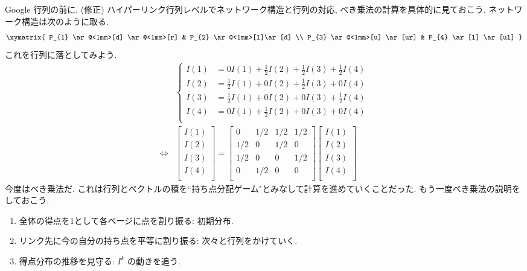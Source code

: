 \documentclass[openany, a4paper, oneside]{jsbook}
\begin{document}
Google 行列の前に, (修正) ハイパーリンク行列レベルでネットワーク構造と行列の対応,
べき乗法の計算を具体的に見ておこう.
ネットワーク構造は次のように取る.
\begin{align}
 \xymatrix{
  P_{1} \ar@<1mm>[d] \ar@<1mm>[r] & P_{2} \ar@<1mm>[l]\ar[d] \\
  P_{3} \ar@<1mm>[u] \ar[ur] & P_{4} \ar[l] \ar[ul]
 }
\end{align}
これを行列に落としてみよう.
\begin{align}
 &\begin{cases}
  I(1)
  &=
  0I(1)    +    \frac{1}{2} I(2)    +    \frac{1}{2}I(3)    +    \frac{1}{2}I(4)\\
  I(2)
  &=
  \frac{1}{2}I(1)    +    0I(2)    +    \frac{1}{2}I(3)    +    0I(4)\\
  I(3)
  &=
  \frac{1}{2}I(1)    +     0I(2)    +    0I(3)    +    \frac{1}{2}I(4)\\
  I(4)
  &=
  0I(1)    +    \frac{1}{2} I(2)    +    0I(3)    +    0I(4)\\
 \end{cases} \\
 \Longleftrightarrow
 &\begin{bmatrix}
  I(1) \\
  I(2) \\
  I(3) \\
  I(4) \\
 \end{bmatrix}
 =
 \begin{bmatrix}
  0    &    1/2    &    1/2    &    1/2\\
  1/2    &    0    &    1/2    &    0\\
  1/2    &    0    &    0    &    1/2\\
  0    &    1/2    &    0    &    0\\
 \end{bmatrix}
 \begin{bmatrix}
  I(1) \\
  I(2) \\
  I(3) \\
  I(4) \\
 \end{bmatrix}
\end{align}
今度はべき乗法だ.
これは行列とベクトルの積を``持ち点分配ゲーム"とみなして計算を進めていくことだった.
もう一度べき乗法の説明をしておこう.
\begin{enumerate}
\item 全体の得点を1として各ページに点を割り振る: 初期分布.
\item リンク先に今の自分の持ち点を平等に割り振る: 次々と行列をかけていく.
\item 得点分布の推移を見守る: $I^k$ の動きを追う.
\end{enumerate}
\end{document}
